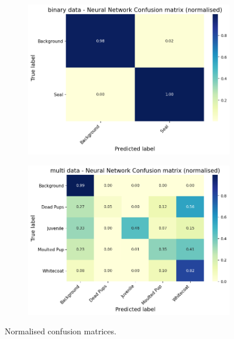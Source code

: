 \documentclass[letterpaper,12pt]{article}
\begin{document}
\begin{figure}[h]
\centering
\begin{subfigure}{.5\textwidth}
  \centering
  \includegraphics[width=\textwidth]{report/figures/binary_mlp_class_distribution_normalised.png}
  \label{fig:binary_mlp_class_distribution_normalised}
\end{subfigure}%
\begin{subfigure}{.5\textwidth}
  \centering
  \includegraphics[width=\textwidth]{report/figures/multi_mlp_class_distribution_normalised.png}
  \label{fig:multi_mlp_class_distribution_normalised}
\end{subfigure}
\caption{\label{fig:mlp_class_distribution_normalised}Normalised confusion matrices.}
\end{figure}
\end{document}
